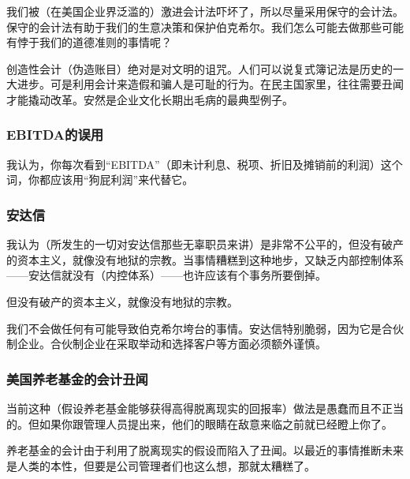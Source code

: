 我们被（在美国企业界泛滥的）激进会计法吓坏了，所以尽量采用保守的会计法。保守的会计法有助于我们的生意决策和保护伯克希尔。我们怎么可能去做那些可能有悖于我们的道德准则的事情呢？
\par

创造性会计（伪造账目）绝对是对文明的诅咒。人们可以说复式簿记法是历史的一大进步。可是利用会计来造假和骗人是可耻的行为。在民主国家里，往往需要丑闻才能撬动改革。安然是企业文化长期出毛病的最典型例子。
\par

\subsubsection*{EBITDA的误用}

我认为，你每次看到“EBITDA”（即未计利息、税项、折旧及摊销前的利润）这个词，你都应该用“狗屁利润”来代替它。
\par

\subsubsection*{安达信}

我认为（所发生的一切对安达信那些无辜职员来讲）是非常不公平的，但没有破产的资本主义，就像没有地狱的宗教。当事情糟糕到这种地步，又缺乏内部控制体系——安达信就没有（内控体系）——也许应该有个事务所要倒掉。
\par

\begin{WisdomBox}
\par

但没有破产的资本主义，就像没有地狱的宗教。
\par
\end{WisdomBox}

我们不会做任何有可能导致伯克希尔垮台的事情。安达信特别脆弱，因为它是合伙制企业。合伙制企业在采取举动和选择客户等方面必须额外谨慎。
\par

\subsubsection*{美国养老基金的会计丑闻}

当前这种（假设养老基金能够获得高得脱离现实的回报率）做法是愚蠢而且不正当的。但如果你跟管理人员提出来，他们的眼睛在敌意来临之前就已经瞪上你了。
\par

养老基金的会计由于利用了脱离现实的假设而陷入了丑闻。以最近的事情推断未来是人类的本性，但要是公司管理者们也这么想，那就太糟糕了。
\par

